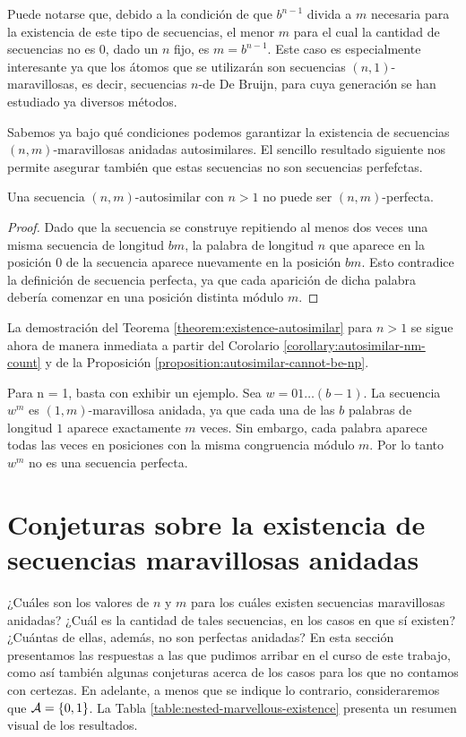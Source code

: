 Puede notarse que, debido a la condición de que $b^{n-1}$ divida a $m$ necesaria
para la existencia de este tipo de secuencias, el menor $m$ para el cual la
cantidad de secuencias no es $0$, dado un $n$ fijo, es $m = b^{n-1}$. Este caso
es especialmente interesante ya que los átomos que se utilizarán son secuencias
$(n, 1)$-maravillosas, es decir, secuencias $n$-de De Bruijn, para cuya
generación se han estudiado ya diversos métodos.

Sabemos ya bajo qué condiciones podemos garantizar la existencia de secuencias
$(n,m)$-maravillosas anidadas autosimilares. El sencillo resultado siguiente nos
permite asegurar también que estas secuencias no son secuencias perfefctas.

\begin{proposition} \label{proposition:autosimilar-cannot-be-np}
	Una secuencia $(n,m)$-autosimilar con $n > 1$ no puede ser $(n,m)$-perfecta.
\end{proposition}

\begin{proof}
	Dado que la secuencia se construye repitiendo al menos dos veces una misma
	secuencia de longitud $bm$, la palabra de longitud $n$ que aparece en la
	posición $0$ de la secuencia aparece nuevamente en la posición $bm$.
	Esto contradice la definición de secuencia perfecta, ya que cada aparición de
	dicha palabra debería comenzar en una posición distinta módulo $m$.
\end{proof}

La demostración del Teorema \ref{theorem:existence-autosimilar} para $n > 1$
se sigue ahora de manera inmediata a partir del Corolario
\ref{corollary:autosimilar-nm-count} y de la Proposición
\ref{proposition:autosimilar-cannot-be-np}.

Para n = 1, basta con exhibir un ejemplo. Sea $w = 01\dots(b-1)$.
La secuencia $w^m$ es $(1,m)$-maravillosa anidada, ya que cada una de las $b$
palabras de longitud $1$ aparece exactamente $m$ veces. Sin embargo, cada
palabra aparece todas las veces en posiciones con la misma congruencia módulo $m$.
Por lo tanto $w^m$ no es una secuencia perfecta.

\chapter{Conjeturas sobre la existencia de secuencias maravillosas anidadas}
\label{chapter:examples-and-conjectures}

¿Cuáles son los valores de $n$ y $m$ para los cuáles existen secuencias
maravillosas anidadas? ¿Cuál es la cantidad de tales secuencias, en los casos
en que sí existen? ¿Cuántas de ellas, además, no son perfectas anidadas?
En esta sección presentamos las respuestas a las que pudimos arribar en el curso
de este trabajo, como así también algunas conjeturas acerca de los casos para
los que no contamos con certezas. En adelante, a menos que se indique lo
contrario, consideraremos que $\mathcal{A} = \lbrace 0, 1 \rbrace$. La Tabla
\ref{table:nested-marvellous-existence} presenta un resumen visual de los
resultados.

